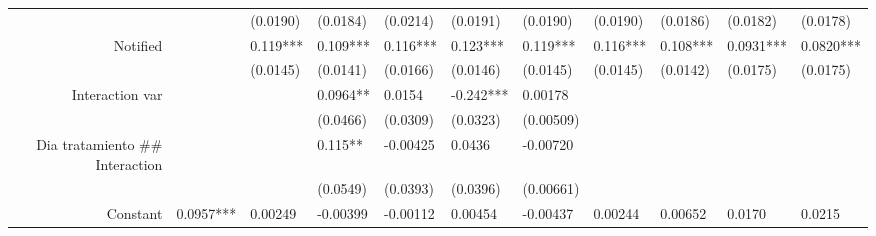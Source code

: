 \begin{tabular}{rrrrrrrrrrr}
      & \multicolumn{1}{l}{} & \multicolumn{1}{l}{(0.0190)} & \multicolumn{1}{l}{(0.0184)} & \multicolumn{1}{l}{(0.0214)} & \multicolumn{1}{l}{(0.0191)} & \multicolumn{1}{l}{(0.0190)} & \multicolumn{1}{l}{(0.0190)} & \multicolumn{1}{l}{(0.0186)} & \multicolumn{1}{l}{(0.0182)} & \multicolumn{1}{l}{(0.0178)} \\
Notified & \multicolumn{1}{l}{} & \multicolumn{1}{l}{0.119***} & \multicolumn{1}{l}{0.109***} & \multicolumn{1}{l}{0.116***} & \multicolumn{1}{l}{0.123***} & \multicolumn{1}{l}{0.119***} & \multicolumn{1}{l}{0.116***} & \multicolumn{1}{l}{0.108***} & \multicolumn{1}{l}{0.0931***} & \multicolumn{1}{l}{0.0820***} \\
      & \multicolumn{1}{l}{} & \multicolumn{1}{l}{(0.0145)} & \multicolumn{1}{l}{(0.0141)} & \multicolumn{1}{l}{(0.0166)} & \multicolumn{1}{l}{(0.0146)} & \multicolumn{1}{l}{(0.0145)} & \multicolumn{1}{l}{(0.0145)} & \multicolumn{1}{l}{(0.0142)} & \multicolumn{1}{l}{(0.0175)} & \multicolumn{1}{l}{(0.0175)} \\
Interaction var & \multicolumn{1}{l}{} & \multicolumn{1}{l}{} & \multicolumn{1}{l}{0.0964**} & \multicolumn{1}{l}{0.0154} & \multicolumn{1}{l}{-0.242***} & \multicolumn{1}{l}{0.00178} & \multicolumn{1}{l}{} & \multicolumn{1}{l}{} & \multicolumn{1}{l}{} & \multicolumn{1}{l}{} \\
      & \multicolumn{1}{l}{} & \multicolumn{1}{l}{} & \multicolumn{1}{l}{(0.0466)} & \multicolumn{1}{l}{(0.0309)} & \multicolumn{1}{l}{(0.0323)} & \multicolumn{1}{l}{(0.00509)} & \multicolumn{1}{l}{} & \multicolumn{1}{l}{} & \multicolumn{1}{l}{} & \multicolumn{1}{l}{} \\
Dia tratamiento \#\# Interaction & \multicolumn{1}{l}{} & \multicolumn{1}{l}{} & \multicolumn{1}{l}{0.115**} & \multicolumn{1}{l}{-0.00425} & \multicolumn{1}{l}{0.0436} & \multicolumn{1}{l}{-0.00720} & \multicolumn{1}{l}{} & \multicolumn{1}{l}{} & \multicolumn{1}{l}{} & \multicolumn{1}{l}{} \\
      & \multicolumn{1}{l}{} & \multicolumn{1}{l}{} & \multicolumn{1}{l}{(0.0549)} & \multicolumn{1}{l}{(0.0393)} & \multicolumn{1}{l}{(0.0396)} & \multicolumn{1}{l}{(0.00661)} & \multicolumn{1}{l}{} & \multicolumn{1}{l}{} & \multicolumn{1}{l}{} & \multicolumn{1}{l}{} \\
Constant & \multicolumn{1}{l}{0.0957***} & \multicolumn{1}{l}{0.00249} & \multicolumn{1}{l}{-0.00399} & \multicolumn{1}{l}{-0.00112} & \multicolumn{1}{l}{0.00454} & \multicolumn{1}{l}{-0.00437} & \multicolumn{1}{l}{0.00244} & \multicolumn{1}{l}{0.00652} & \multicolumn{1}{l}{0.0170} & \multicolumn{1}{l}{0.0215} \\

\end{tabular}
